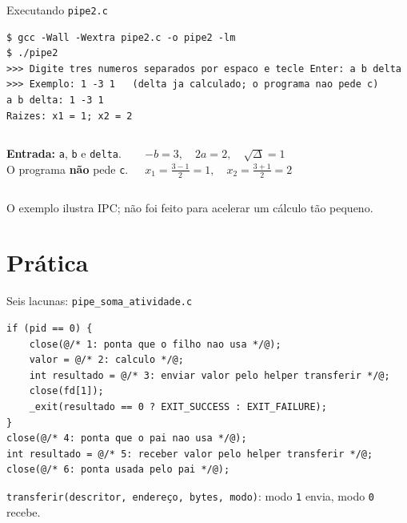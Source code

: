 \documentclass[aspectratio=169]{beamer}
\begin{document}
\begin{frame}[fragile]{Executando \texttt{pipe2.c}}
\begin{lstlisting}[style=terminal]
$ gcc -Wall -Wextra pipe2.c -o pipe2 -lm
$ ./pipe2
>>> Digite tres numeros separados por espaco e tecle Enter: a b delta
>>> Exemplo: 1 -3 1   (delta ja calculado; o programa nao pede c)
a b delta: 1 -3 1
Raizes: x1 = 1; x2 = 2
\end{lstlisting}

\begin{columns}[T]
\textbf{Entrada:} \texttt{a}, \texttt{b} e \texttt{delta}.\\
O programa \textbf{não} pede \texttt{c}.

$-b = 3, \quad 2a = 2, \quad \sqrt{\Delta} = 1$\\[0.3em]
$x_1 = \frac{3-1}{2} = 1, \quad x_2 = \frac{3+1}{2} = 2$
\end{columns}

\vspace{0.6em}
\small O exemplo ilustra IPC; não foi feito para acelerar um cálculo tão pequeno.
\end{frame}

\section{Prática}

\begin{frame}[fragile]{Seis lacunas: \texttt{pipe\_soma\_atividade.c}}
\begin{lstlisting}[style=codigo]
if (pid == 0) {
    close(@/* 1: ponta que o filho nao usa */@);
    valor = @/* 2: calculo */@;
    int resultado = @/* 3: enviar valor pelo helper transferir */@;
    close(fd[1]);
    _exit(resultado == 0 ? EXIT_SUCCESS : EXIT_FAILURE);
}
close(@/* 4: ponta que o pai nao usa */@);
int resultado = @/* 5: receber valor pelo helper transferir */@;
close(@/* 6: ponta usada pelo pai */@);
\end{lstlisting}

\small \texttt{transferir(descritor, endereço, bytes, modo)}: modo \texttt{1} envia, modo \texttt{0} recebe.
\end{frame}
\end{document}
